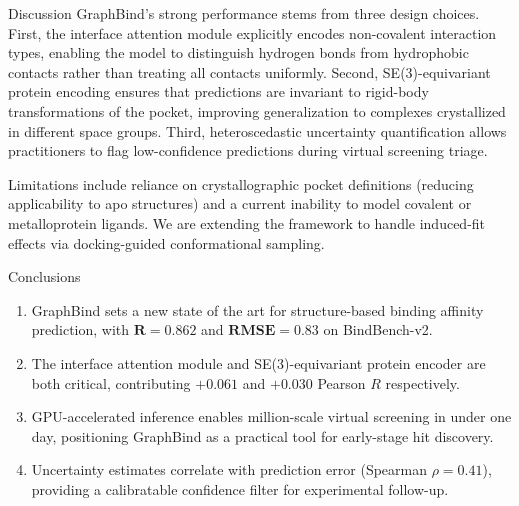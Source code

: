 \documentclass[14pt]{extarticle}
\begin{document}
\begin{minipage}[t]{0.31\textwidth}
\RaggedRight

\begin{posterblock}{Discussion}
GraphBind's strong performance stems from three design choices. First, the interface attention module explicitly
encodes non-covalent interaction types, enabling the model to distinguish hydrogen bonds from hydrophobic contacts
rather than treating all contacts uniformly. Second, SE(3)-equivariant protein encoding ensures that predictions are
invariant to rigid-body transformations of the pocket, improving generalization to complexes crystallized in different
space groups. Third, heteroscedastic uncertainty quantification allows practitioners to flag low-confidence predictions
during virtual screening triage.

Limitations include reliance on crystallographic pocket definitions (reducing applicability to apo structures) and a
current inability to model covalent or metalloprotein ligands. We are extending the framework to handle induced-fit
effects via docking-guided conformational sampling.
\end{posterblock}

\begin{posterblock}{Conclusions}
\begin{enumerate}[leftmargin=*, itemsep=8pt, topsep=6pt]
  \item GraphBind sets a new state of the art for structure-based binding affinity prediction, with
        $\mathbf{R = 0.862}$ and $\mathbf{RMSE = 0.83}$ on BindBench-v2.
  \item The interface attention module and SE(3)-equivariant protein encoder are both critical,
        contributing $+0.061$ and $+0.030$ Pearson $R$ respectively.
  \item GPU-accelerated inference enables million-scale virtual screening in under one day, positioning
        GraphBind as a practical tool for early-stage hit discovery.
  \item Uncertainty estimates correlate with prediction error (Spearman $\rho = 0.41$), providing a
        calibratable confidence filter for experimental follow-up.
\end{enumerate}
\end{posterblock}


\end{minipage}
\end{document}
